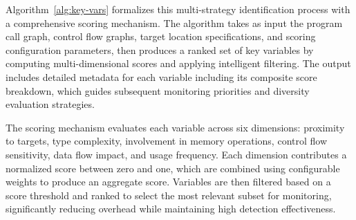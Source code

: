\documentclass[review]{elsarticle}
\begin{document}
Algorithm~\ref{alg:key-vars} formalizes this multi-strategy identification process with a comprehensive scoring mechanism. The algorithm takes as input the program call graph, control flow graphs, target location specifications, and scoring configuration parameters, then produces a ranked set of key variables by computing multi-dimensional scores and applying intelligent filtering. The output includes detailed metadata for each variable including its composite score breakdown, which guides subsequent monitoring priorities and diversity evaluation strategies.

The scoring mechanism evaluates each variable across six dimensions: proximity to targets, type complexity, involvement in memory operations, control flow sensitivity, data flow impact, and usage frequency. Each dimension contributes a normalized score between zero and one, which are combined using configurable weights to produce an aggregate score. Variables are then filtered based on a score threshold and ranked to select the most relevant subset for monitoring, significantly reducing overhead while maintaining high detection effectiveness.
\end{document}
